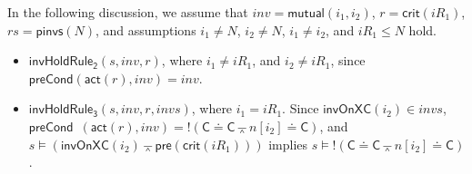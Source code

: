 \documentclass[conference]{IEEEtran}
\def \eqc {\doteq }
\def \andc {\barwedge }
\def \negc {!}
\begin{document}
\begin{example}
In the following discussion, we assume that $inv=\mathsf{mutual} (i_1,i_2)$, $r=\mathsf{crit}(iR_1)$, $rs= \mathsf{pinvs} (N)$, and   assumptions  $i_1 \neq N$, $i_2 \neq N$, $i_1 \neq i_2$, and $iR_1 \leq N$ hold.

\begin{itemize}%




\item     $\mathsf{invHoldRule_2 }(s,inv,r)$, where   $i_1 \neq iR_1$, and $i_2 \neq iR_1$, since $\mathsf{preCond}(\mathsf{act}(r),inv)=inv$.


 \item   $\mathsf{invHoldRule_3 }(s,inv,r,invs)$, where  $i_1 = iR_1$.
  Since
 $\mathsf{invOnXC}( i_2) \in invs$, $\mathsf{preCond}$\ $(\mathsf{act}(r),inv)=\negc (\mathsf{C}\eqc\mathsf{C}\andc n[i_2]\eqc\mathsf{C})$, and $s \models (\mathsf{invOnXC}( i_2) \andc \mathsf{pre}(\mathsf{crit}(iR_1)))$ implies  $s \models \negc (\mathsf{C}\eqc\mathsf{C}\andc n[i_2]\eqc\mathsf{C})$.



\end{itemize}
\end{example}
\end{document}
